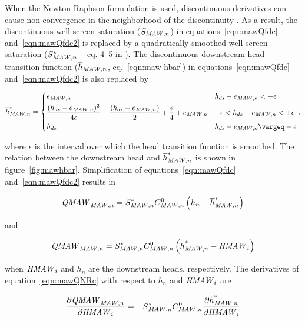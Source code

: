 When the Newton-Raphson formulation is used, discontinuous derivatives can cause non-convergence in the neighborhood of the discontinuity \citep{doi:10.1029/2006WR005195}. As a result, the discontinuous well screen saturation ($S_{\mathit{MAW},n}$) in equations~\ref{eqn:mawQfdc} and~\ref{eqn:mawQfdc2} is replaced by a quadratically smoothed well screen saturation ($S_{\mathit{MAW},n}^*$ -- eq. 4--5 in \cite{modflow6gwf}). The discontinuous downstream head transition function ($\overline{h}_{\mathit{MAW},n}$, eq.~\ref{eqn:maw-hbar}) in equations~\ref{eqn:mawQfdc} and~\ref{eqn:mawQfdc2} is also replaced by

\begin{align}
	\label{eqn:maw-chbar}
	\overline{h}_{\mli{MAW},n}^* = \begin{dcases}
		e_{\mli{MAW},n} &  h_{ds} - e_{\mli{MAW},n} < -\epsilon \\
		\frac{( h_{ds} - e_{\mli{MAW},n} )^2}{4 \epsilon} + \frac{( h_{ds} - e_{\mli{MAW},n} )}{2} + \frac{\epsilon}{4} + e_{\mli{MAW},n}  & -\epsilon < h_{ds} - e_{\mli{MAW},n} < +\epsilon \\
		h_{ds} & h_{ds} - e_{\mli{MAW},n} \ge +\epsilon
	\end{dcases} ,
\end{align}

\noindent where $\epsilon$ is the interval over which the head transition function is smoothed. The relation between the downstream head and $\overline{h}^*_{\mathit{MAW},n}$ is shown in figure~\ref{fig:mawhbar}. Simplification of equations~\ref{eqn:mawQfdc} and~\ref{eqn:mawQfdc2} results in

\begin{align}
	\label{eqn:mawQNRc}
	\mathit{QMAW}_{\mathit{MAW},n} = S_{\mathit{MAW},n}^* C_{\mathit{MAW},n}^0 \left( h_n - \overline{h}^*_{\mathit{MAW},n} \right)
\end{align}

\noindent and

\begin{align}
	\label{eqn:mawQNRc2}
	\mathit{QMAW}_{\mathit{MAW},n} = S_{\mathit{MAW},n}^* C_{\mathit{MAW},n}^0 \left( \overline{h}^*_{\mathit{MAW},n} - \mathit{HMAW}_{i} \right)
\end{align}

\noindent when $\mathit{HMAW}_i$ and $h_n$ are the downstream heads, respectively. The derivatives of equation~\ref{eqn:mawQNRc} with respect to $h_n$ and $\mathit{HMAW}_i$ are

\begin{equation}
	\label{eqn:nrMawdQdh1}
	\frac{\partial \mathit{QMAW}_{\mathit{MAW},n}}{\partial \mathit{HMAW}_i} =  -S_{\mathit{MAW},n}^* C_{\mathit{MAW},n}^0 \frac{\partial \overline{h}^*_{\mathit{MAW},n}}{{\partial \mathit{HMAW}_i}}
\end{equation}

